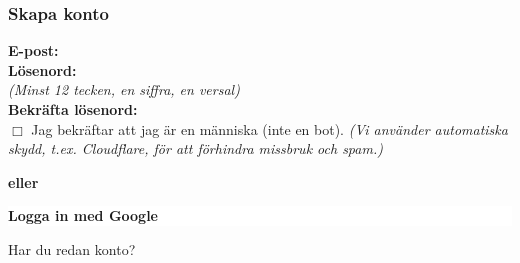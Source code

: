 \documentclass[10pt]{beamer}
\begin{document}
\begin{frame}[label=register]
  \frametitle{Skapa konto}

  \vspace{0.5cm}
  \begin{minipage}{0.9\textwidth}
    \small
    \textbf{E-post:} \underline{\hspace{6.5cm}} \\
    \textbf{Lösenord:} \underline{\hspace{6.5cm}} \\
    \footnotesize\textit{(Minst 12 tecken, en siffra, en versal)} \\
    \textbf{Bekräfta lösenord:} \underline{\hspace{6.5cm}} \\

    \vspace{0.8cm}
    $\Box$ Jag bekräftar att jag är en människa (inte en bot).
    \footnotesize
    \textit{(Vi använder automatiska skydd, t.ex. Cloudflare, för att förhindra missbruk och spam.)}

    \vspace{1.2cm}
    \centering
    
    \vspace{1.2cm}
    \textcolor{warmbrown}{\textbf{eller}}
    
    \vspace{0.6cm}
    \colorbox{white}{%
      \parbox{5cm}{\centering\footnotesize\textbf{Logga in med Google}}%
    }
  \end{minipage}
  
  \vspace{0.8cm}
  \begin{center}
    \footnotesize
    Har du redan konto? \hyperlink{login}{}
  \end{center}
\end{frame}
\end{document}
